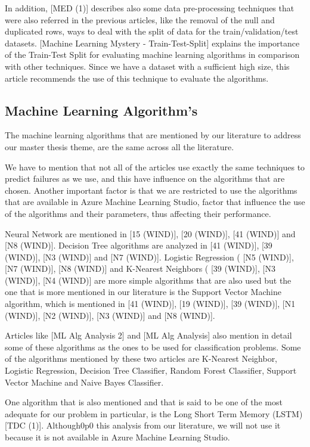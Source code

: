 In addition, [MED (1)] describes also some data pre-processing techniques that were also referred in the previous articles, like the removal of the null and duplicated rows, ways to deal with the split of data for the train/validation/test datasets.
[Machine Learning Mystery - Train-Test-Split] explains the importance of the Train-Test Split for evaluating machine learning algorithms in comparison with other techniques. Since we have a dataset with a sufficient high size, this article recommends the use of this technique to evaluate the algorithms.


\subsection{Machine Learning Algorithm's}

The machine learning algorithms that are mentioned by our literature to address our master thesis theme, are the same across all the literature.

We have to mention that not all of the articles use exactly the same techniques to predict failures as we use, and this have influence on the algorithms that are chosen. Another important factor is that we are restricted to use the algorithms that are available in Azure Machine Learning Studio, factor that influence the use of the algorithms and their parameters, thus affecting their performance.

Neural Network are mentioned in [15 (WIND)], [20 (WIND)], [41 (WIND)] and [N8 (WIND)]. Decision Tree algorithms are analyzed in [41 (WIND)], [39 (WIND)], [N3 (WIND)] and [N7 (WIND)]. Logistic Regression ( [N5 (WIND)], [N7 (WIND)], [N8 (WIND)] and K-Nearest Neighbors ( [39 (WIND)], [N3 (WIND)], [N4 (WIND)] are more simple algorithms that are also used but the one that is more mentioned in our literature is the Support Vector Machine algorithm, which is mentioned in [41 (WIND)], [19 (WIND)], [39 (WIND)], [N1 (WIND)], [N2 (WIND)], [N3 (WIND)] and [N8 (WIND)].

Articles like [ML Alg Analysis 2] and [ML Alg Analysis] also mention in detail some of these algorithms as the ones to be used for classification problems. Some of the algorithms mentioned by these two articles are K-Nearest Neighbor, Logistic Regression, Decision Tree Classifier, Random Forest Classifier, Support Vector Machine and Naive Bayes Classifier.

One algorithm that is also mentioned and that is said to be one of the most adequate for our problem in particular, is the Long Short Term Memory (LSTM) [TDC (1)]. Although0p0 this analysis from our literature, we will not use it because it is not available in Azure Machine Learning Studio.


